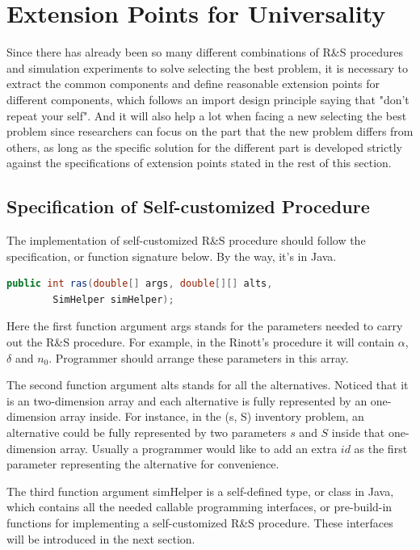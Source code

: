 \documentclass[12pt,a4paper]{report}
\begin{document}
\section{Extension Points for Universality}

Since there has already been so many different combinations of R\&S procedures and simulation experiments to solve selecting the best problem, it is necessary to extract the common components and define reasonable extension points for different components, which follows an import design principle saying that "don't repeat your self". And it will also help a lot when facing a new selecting the best problem since researchers can focus on the part that the new problem differs from others, as long as the specific solution for the different part is developed strictly against the specifications of extension points stated in the rest of this section.

\subsection{Specification of Self-customized Procedure}

The implementation of self-customized R\&S procedure should follow the specification, or function signature below. By the way, it's in Java.

\begin{lstlisting}[language=Java]
public int ras(double[] args, double[][] alts,
        SimHelper simHelper);
\end{lstlisting}

Here the first function argument args stands for the parameters needed to carry out the R\&S procedure. For example, in the Rinott's procedure it will contain $\alpha$, $\delta$ and $n_0$. Programmer should arrange these parameters in this array.

The second function argument alts stands for all the alternatives. Noticed that it is an two-dimension array and each alternative is fully represented by an one-dimension array inside. For instance, in the (s, S) inventory problem, an alternative could be fully represented by two parameters $s$ and $S$ inside that one-dimension array. Usually a programmer would like to add an extra $id$ as the first parameter representing the alternative for convenience.

The third function argument simHelper is a self-defined type, or class in Java, which contains all the needed callable programming interfaces, or pre-build-in functions for implementing a self-customized R\&S procedure. These interfaces will be introduced in the next section.
\end{document}

